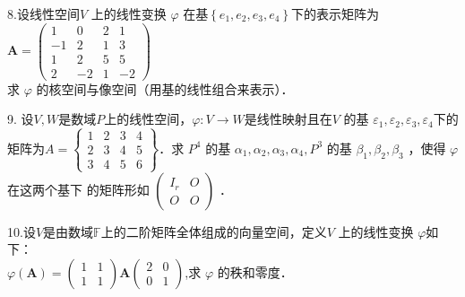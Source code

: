 \documentclass[11pt,a4paper]{article}
\begin{document}
	\vspace*{8cm}
	
	
	
	
	
	
	
	
	8.设线性空间$ V $ 上的线性变换 $ \varphi$ 在基$\left\{e_{1}, e_{2}, e_{3}, e_{4}\right\} $下的表示矩阵为\\$\boldsymbol{A}=\left(\begin{array}{cccc}1 & 0 & 2 & 1 \\-1 & 2 & 1 & 3 \\1 & 2 & 5 & 5 \\2 & -2 & 1 & -2\end{array}\right)$\\ 求 $\varphi$ 的核空间与像空间（用基的线性组合来表示）．
	
	
	
	
	\vspace*{9cm}
	
	9. 设$  V, W  $是数域$  P  $上的线性空间，$ \varphi: V \rightarrow W  $是线性映射且在$  V $ 的基  $\varepsilon_{1}, \varepsilon_{2}, \varepsilon_{3}, \varepsilon_{4}  $下的矩阵为$  A=\left\{\begin{array}{cccc}1 & 2 & 3 & 4 \\ 2 & 3 & 4 & 5 \\ 3 & 4 & 5 & 6\end{array}\right\}  $．求 $ P^{4} $ 的基  $\alpha_{1}, \alpha_{2}, \alpha_{3}, \alpha_{4} , P^{3} $ 的基 $ \beta_{1}, \beta_{2}, \beta_{3} $ ，使得 $ \varphi$  在这两个基下
	的矩阵形如
	  $\left(\begin{array}{cc}I_{r} & O \\ O & O\end{array}\right) $ ．
	
	
	
	\vspace*{10cm}
	
	
	10.设$  V  $是由数域$  \mathbb{F}  $上的二阶矩阵全体组成的向量空间，定义$  V $ 上的线性变换 $ \varphi  $如下：\\$\varphi(\boldsymbol{A})=\left(\begin{array}{ll}1 & 1 \\1 & 1\end{array}\right) \boldsymbol{A}\left(\begin{array}{ll}2 & 0 \\0 & 1\end{array}\right)$,求 $ \varphi $ 的秩和零度．
	
	
	
\end{document}
